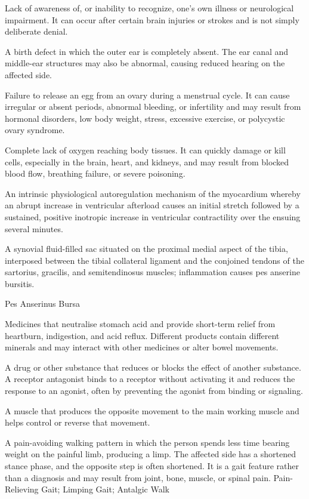  Lack of awareness of, or inability to recognize, one’s own illness or neurological impairment. It can occur after certain brain injuries or strokes and is not simply deliberate denial.

 A birth defect in which the outer ear is completely absent. The ear canal and middle-ear structures may also be abnormal, causing reduced hearing on the affected side.

 Failure to release an egg from an ovary during a menstrual cycle. It can cause irregular or absent periods, abnormal bleeding, or infertility and may result from hormonal disorders, low body weight, stress, excessive exercise, or polycystic ovary syndrome.

 Complete lack of oxygen reaching body tissues. It can quickly damage or kill cells, especially in the brain, heart, and kidneys, and may result from blocked blood flow, breathing failure, or severe poisoning.

 An intrinsic physiological autoregulation mechanism of the myocardium whereby an abrupt increase in ventricular afterload causes an initial stretch followed by a sustained, positive inotropic increase in ventricular contractility over the ensuing several minutes.

 A synovial fluid-filled sac situated on the proximal medial aspect of the tibia, interposed between the tibial collateral ligament and the conjoined tendons of the sartorius, gracilis, and semitendinosus muscles; inflammation causes pes anserine bursitis.

\synonyms
Pes Anserinus Bursa

 Medicines that neutralise stomach acid and provide short-term relief from heartburn, indigestion, and acid reflux. Different products contain different minerals and may interact with other medicines or alter bowel movements.

 A drug or other substance that reduces or blocks the effect of another substance. A receptor antagonist binds to a receptor without activating it and reduces the response to an agonist, often by preventing the agonist from binding or signaling.

 A muscle that produces the opposite movement to the main working muscle and helps control or reverse that movement.

 A pain-avoiding walking pattern in which the person spends less
time bearing weight on the painful limb, producing a limp. The affected side has a shortened
stance phase, and the opposite step is often shortened. It is a gait feature rather than a
diagnosis and may result from joint, bone, muscle, or spinal pain.
\synonyms
Pain-Relieving Gait; Limping Gait; Antalgic Walk

